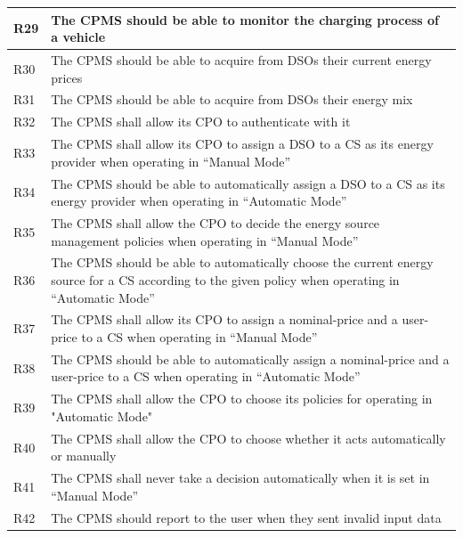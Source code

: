 \documentclass[11pt]{article}
\begin{document}
\begin{table}[H]
\begin{tabularx}{\textwidth}{|>{\centering\hsize=0.1\hsize}X|>{\hsize=1.9\hsize}X|}
        \hline
        R29 & The CPMS should be able to monitor the charging process of a vehicle \\
        \hline
        R30 & The CPMS should be able to acquire from DSOs their current energy prices \\
        \hline
        R31 & The CPMS should be able to acquire from DSOs their energy mix \\
        \hline
        R32 & The CPMS shall allow its CPO to authenticate with it \\
        \hline
        R33 & The CPMS shall allow its CPO to assign a DSO to a CS as its energy provider  when operating in “Manual Mode” \\
        \hline
        R34 & The CPMS should be able to automatically assign a DSO to a CS as its energy provider when operating in “Automatic Mode” \\
        \hline
        R35 & The CPMS shall allow the CPO to decide the energy source management policies when operating in “Manual Mode” \\
        \hline
        R36 & The CPMS should be able to automatically choose the current energy source for a CS according to the given policy when operating in “Automatic Mode” \\
        \hline
        R37 & The CPMS shall allow its CPO to assign a nominal-price and a user-price to a CS when operating in “Manual Mode” \\
        \hline
        R38 & The CPMS should be able to automatically assign a nominal-price and a user-price to a CS when operating in “Automatic Mode” \\
        \hline
        R39 & The CPMS shall allow the CPO to choose its policies for operating in "Automatic Mode" \\
        \hline
        R40 & The CPMS shall allow the CPO to choose whether it acts automatically or manually \\
        \hline
        R41 & The CPMS shall never take a decision automatically when it is set in “Manual Mode” \\
        \hline
        R42 & The CPMS should report to the user when they sent invalid input data \\
        \hline
        \end{tabularx}
    \label{tab:requirements}
\end{table}
\end{document}
